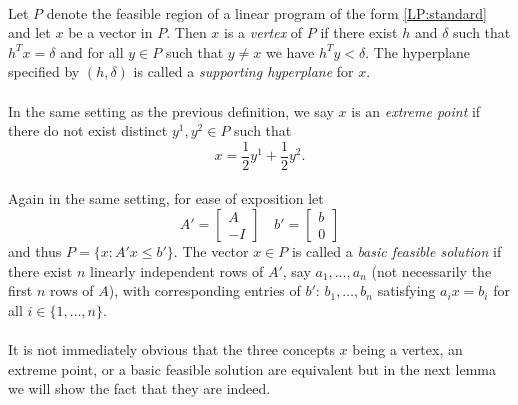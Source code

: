 \paragraph{}
Let $P$ denote the feasible region of a linear program of the form \ref{LP:standard} and let $x$ be a vector in $P$. Then $x$ is a {\it vertex} of $P$ if there exist $h$ and $\delta$ such that $h^Tx = \delta$ and for all $y \in P$
such that $y \neq x$ we have $h^Ty < \delta$. The hyperplane specified by $(h,\delta)$ is called a {\it supporting hyperplane} for $x$.

\paragraph{}In the same setting as the previous definition, we say $x$ is an {\it extreme point} if there do not exist distinct $y^1, y^2 \in P$ such that 
$$ x = \frac{1}{2} y^1 + \frac{1}{2}y^2.$$

\paragraph{}Again in the same setting, for ease of exposition let \begin{equation}A' = \begin{bmatrix} A \\ -I \end{bmatrix} \quad b' = \begin{bmatrix} b \\ 0 \end{bmatrix}\label{LP:augmented}\end{equation} and thus $P = \{x : A'x \leq b'\}$. The vector $x\in P$ is called a {\it basic feasible solution} if there exist $n$ linearly independent rows of $A'$, say $a_1, \dots, a_n$ (not necessarily the first $n$ rows of $A$), with corresponding entries of $b'$: $b_1, \dots, b_n$ satisfying $a_i x = b_i$ for all $i\in \{1,\dots, n\}$.

\paragraph{} It is not immediately obvious that the three concepts $x$ being a vertex, an extreme point, or a basic feasible solution are equivalent but in the next lemma we will show the fact that they are indeed.

